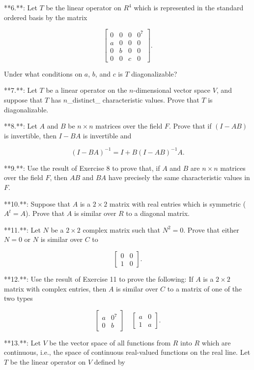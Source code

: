 

**6.**: Let \(T\) be the linear operator on \(R^{4}\) which is represented in the standard ordered basis by the matrix

\[\begin{bmatrix}0&0&0&0^{7}\\ a&0&0&0\\ 0&b&0&0\\ 0&0&c&0\end{bmatrix}.\]

Under what conditions on \(a\), \(b\), and \(c\) is \(T\) diagonalizable?

**7.**: Let \(T\) be a linear operator on the \(n\)-dimensional vector space \(V\), and suppose that \(T\) has \(n\)_distinct_ characteristic values. Prove that \(T\) is diagonalizable.

**8.**: Let \(A\) and \(B\) be \(n\times n\) matrices over the field \(F\). Prove that if \((I-AB)\) is invertible, then \(I-BA\) is invertible and

\[(I-BA)^{-1}=I+B(I-AB)^{-1}A.\]

**9.**: Use the result of Exercise 8 to prove that, if \(A\) and \(B\) are \(n\times n\) matrices over the field \(F\), then \(AB\) and \(BA\) have precisely the same characteristic values in \(F\).

**10.**: Suppose that \(A\) is a \(2\times 2\) matrix with real entries which is symmetric (\(A^{t}=A\)). Prove that \(A\) is similar over \(R\) to a diagonal matrix.

**11.**: Let \(N\) be a \(2\times 2\) complex matrix such that \(N^{2}=0\). Prove that either \(N=0\) or \(N\) is similar over \(C\) to

\[\begin{bmatrix}0&0\\ 1&0\end{bmatrix}.\]

**12.**: Use the result of Exercise 11 to prove the following: If \(A\) is a \(2\times 2\) matrix with complex entries, then \(A\) is similar over \(C\) to a matrix of one of the two types

\[\begin{bmatrix}a&0^{7}\\ 0&b\end{bmatrix}\quad\begin{bmatrix}a&0\\ 1&a\end{bmatrix}.\]

**13.**: Let \(V\) be the vector space of all functions from \(R\) into \(R\) which are continuous, i.e., the space of continuous real-valued functions on the real line. Let \(T\) be the linear operator on \(V\) defined by

